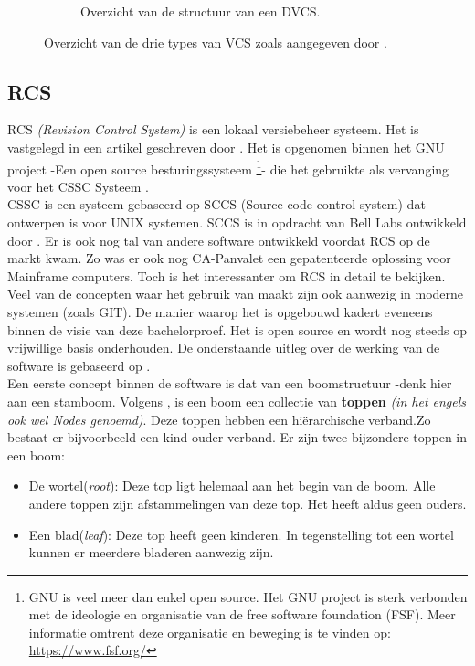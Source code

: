 \begin{figure}[h!]
\begin{subfigure}{.5\textwidth}
	\caption[Overzicht structuur DVCS]{Overzicht van de structuur van een DVCS.}
	\end{subfigure}
	
	\caption[Overzicht types VCS]{Overzicht van de drie types van VCS zoals aangegeven door \textcite{Chacon2014}.}
	\label{fig:TypesVCS}
\end{figure}

	
\subsection{RCS}
\label{sec:RCS}


RCS \textit{(Revision Control System)} is een lokaal versiebeheer systeem. Het is vastgelegd in een artikel geschreven door \textcite{Tichy85rcs}. Het is opgenomen binnen het GNU project -Een open source besturingssysteem \footnote{GNU is veel meer dan enkel open source. Het GNU project is sterk verbonden met de ideologie en organisatie van de free software foundation (FSF). Meer informatie omtrent deze organisatie en beweging is te vinden op: \url{https://www.fsf.org/}}- die het gebruikte als vervanging voor het CSSC Systeem \autocite{GNUCSSC}.\\

CSSC is een systeem gebaseerd op SCCS (Source code control system) dat ontwerpen is voor UNIX systemen. SCCS is in opdracht van Bell Labs ontwikkeld door \textcite{Rochkind1975}. Er is ook nog tal van andere software ontwikkeld voordat RCS op de markt kwam. Zo was er ook nog CA-Panvalet een gepatenteerde oplossing voor Mainframe computers. Toch is het interessanter om RCS in detail te bekijken. Veel van de concepten waar het gebruik van maakt zijn ook aanwezig in moderne systemen (zoals GIT). De manier waarop het is opgebouwd kadert eveneens binnen de visie van deze bachelorproef. Het is open source en wordt nog steeds op vrijwillige basis onderhouden. De onderstaande uitleg over de werking van de software is gebaseerd op \textcite{Tichy85rcs}.\\

Een eerste concept binnen de software is dat van een boomstructuur -denk hier aan een stamboom. Volgens \textcite{Lievens2019}, is een boom een collectie van \textbf{toppen} \textit{(in het engels ook wel Nodes genoemd)}. Deze toppen hebben een hiërarchische verband.Zo bestaat er bijvoorbeeld een kind-ouder verband. Er zijn twee bijzondere toppen in een boom:

\begin{itemize}
	\item De wortel(\textit{root}): Deze top ligt helemaal aan het begin van de boom. Alle andere toppen zijn afstammelingen van deze top. Het heeft aldus geen ouders.
	\item Een blad(\textit{leaf}): Deze top heeft geen kinderen. In tegenstelling tot een wortel kunnen er meerdere bladeren aanwezig zijn.
\end{itemize}

